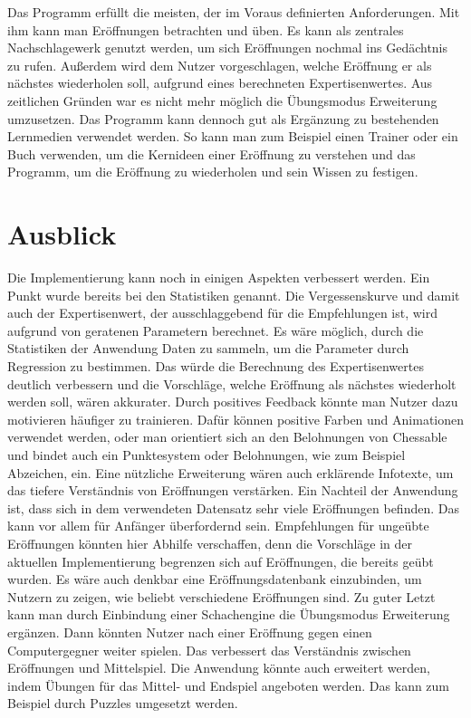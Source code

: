 Das Programm erfüllt die meisten, der im Voraus definierten Anforderungen. Mit ihm kann man Eröffnungen betrachten und üben. Es kann als zentrales Nachschlagewerk genutzt werden, um sich Eröffnungen nochmal ins Gedächtnis zu rufen. Außerdem wird dem Nutzer vorgeschlagen, welche Eröffnung er als nächstes wiederholen soll, aufgrund eines berechneten Expertisenwertes. Aus zeitlichen Gründen war es nicht mehr möglich die Übungsmodus Erweiterung umzusetzen. Das Programm kann dennoch gut als Ergänzung zu bestehenden Lernmedien verwendet werden. So kann man zum Beispiel einen Trainer oder ein Buch verwenden, um die Kernideen einer Eröffnung zu verstehen und das Programm, um die Eröffnung zu wiederholen und sein Wissen zu festigen.

\section{Ausblick}
Die Implementierung kann noch in einigen Aspekten verbessert werden. Ein Punkt wurde bereits bei den Statistiken genannt. Die Vergessenskurve und damit auch der Expertisenwert, der ausschlaggebend für die Empfehlungen ist, wird aufgrund von geratenen Parametern berechnet. Es wäre möglich, durch die Statistiken der Anwendung Daten zu sammeln, um die Parameter durch Regression zu bestimmen. Das würde die Berechnung des Expertisenwertes deutlich verbessern und die Vorschläge, welche Eröffnung als nächstes wiederholt werden soll, wären akkurater.
Durch positives Feedback könnte man Nutzer dazu motivieren häufiger zu trainieren. Dafür können positive Farben und Animationen verwendet werden, oder man orientiert sich an den Belohnungen von Chessable und bindet auch ein Punktesystem oder Belohnungen, wie zum Beispiel Abzeichen, ein.
Eine nützliche Erweiterung wären auch erklärende Infotexte, um das tiefere Verständnis von Eröffnungen verstärken.
Ein Nachteil der Anwendung ist, dass sich in dem verwendeten Datensatz sehr viele Eröffnungen befinden. Das kann vor allem für Anfänger überfordernd sein. Empfehlungen für ungeübte Eröffnungen könnten hier Abhilfe verschaffen, denn die Vorschläge in der aktuellen Implementierung begrenzen sich auf Eröffnungen, die bereits geübt wurden. Es wäre auch denkbar eine Eröffnungsdatenbank einzubinden, um Nutzern zu zeigen, wie beliebt verschiedene Eröffnungen sind.
Zu guter Letzt kann man durch Einbindung einer Schachengine die Übungsmodus Erweiterung ergänzen. Dann könnten Nutzer nach einer Eröffnung gegen einen Computergegner weiter spielen. Das verbessert das Verständnis zwischen Eröffnungen und Mittelspiel.
Die Anwendung könnte auch erweitert werden, indem Übungen für das Mittel- und Endspiel angeboten werden. Das kann zum Beispiel durch Puzzles umgesetzt werden.
